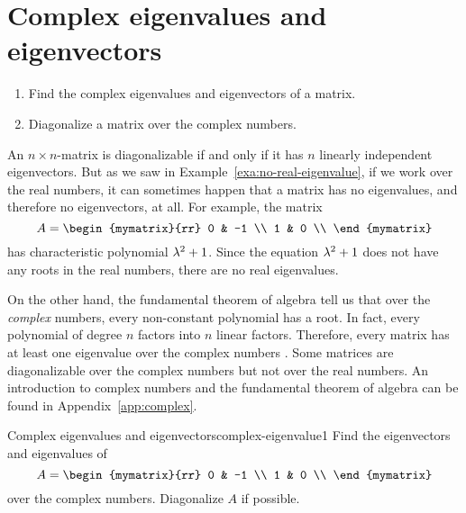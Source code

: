 \section{Complex eigenvalues and eigenvectors}

\begin{outcome}
  \begin{enumerate}
  \item Find the complex eigenvalues and eigenvectors of a matrix.
  \item Diagonalize a matrix over the complex numbers.
  \end{enumerate}
\end{outcome}

An $n\times n$-matrix is diagonalizable if and only if it has $n$
linearly independent eigenvectors. But as we saw in
Example~\ref{exa:no-real-eigenvalue}, if we work over the real
numbers, it can sometimes happen that a matrix has no eigenvalues, and
therefore no eigenvectors, at all. For example, the matrix
\begin{equation*}
  A=\begin{mymatrix}{rr}
      0 & -1 \\
      1 &  0 \\
    \end{mymatrix}
\end{equation*}
has characteristic polynomial $\lambda^2+1$. Since the equation
$\lambda^2+1$ does not have any roots in the real numbers, there are
no real eigenvalues.

On the other hand, the fundamental theorem of algebra tell us that
over the {\em complex} numbers, every non-constant polynomial has a
root. In fact, every polynomial of degree $n$ factors into $n$ linear
factors. Therefore, every matrix has at least one eigenvalue over the
complex numbers%
%
%
%
%
. Some matrices are diagonalizable
over the complex numbers but not over the real numbers. An
introduction to complex numbers and the fundamental theorem of algebra
can be found in Appendix~\ref{app:complex}.

\begin{example}{Complex eigenvalues and eigenvectors}{complex-eigenvalue1}
  Find the eigenvectors and eigenvalues of
  \begin{equation*}
    A=\begin{mymatrix}{rr}
      0 & -1 \\
      1 &  0 \\
    \end{mymatrix}
  \end{equation*}
  over the complex numbers. Diagonalize $A$ if possible.
\end{example}

